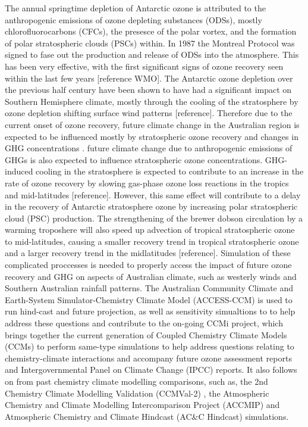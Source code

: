 The annual springtime depletion of Antarctic ozone is attributed to the anthropogenic emissions of ozone depleting substances (ODSs), mostly chlorofluorocarbons (CFCs), the presesce of the polar vortex, and the formation of polar stratospheric clouds (PSCs) within. In 1987 the Montreal Protocol was signed to fase out the production and release of ODSs into the atmosphere. This has been very effective, with the first significant signs of ozone recovery seen within the last few years [reference WMO]. The Antarctic ozone depletion over the previous half century have been shown to have had a significant impact on Southern Hemisphere climate, mostly through the cooling of the stratosphere by ozone depletion shifting surface wind patterns [reference]. Therefore due to the current onset of ozone recovery, future climate change in the Australian region is expected to be influenced mostly by stratospheric ozone recovery and changes in GHG concentrations \citep{Arblaster:2011gk}. future climate change due to anthropogenic emissions of GHGs is also expected to influence stratospheric ozone concentrations. GHG-induced cooling in the stratosphere is expected to contribute to an increase in the rate of ozone recovery by slowing gas-phase ozone loss reactions in the tropics and mid-latitudes [reference]. However, this same effect will contribute to a delay in the recovery of Antarctic stratosphere ozone by increasing polar stratospheric cloud (PSC) production. The strengthening of the brewer dobson circulation by a warming troposhere will also speed up advection of tropical stratospheric ozone to mid-latitudes, causing a smaller recovery trend in tropical stratospheric ozone and a larger recovery trend in the midlatitudes [reference]. Simulation of these complicated proccesses is needed to properly access the impact of future ozone recovery and GHG on aspects of Australian climate, such as westerly winds and Southern Australian rainfall patterns. The Australian Community Climate and Earth-System Simulator-Chemistry Climate Model (ACCESS-CCM) is used to run hind-cast and future projection, as well as sensitivity simualtions to to help address these questions and contribute to the on-going CCMi project, which brings together the current generation of Coupled Chemistry Climate Models (CCMs) to perform same-type simulations to help address questions relating to chemistry-climate interactions and accompany future ozone assessment reports and Intergovernmental Panel on Climate Change (IPCC) reports. It also follows on from past chemistry climate modelling comparisons, such as, the 2nd Chemistry Climate Modelling Validation (CCMVal-2) \citep{CCMVal:uf}, the Atmospheric Chemistry and Climate Modelling Intercomparison Project (ACCMIP) \citep{Lamarque:2013jm} and Atmospheric Chemistry and Climate Hindcast (AC&C Hindcast) simulations. 

